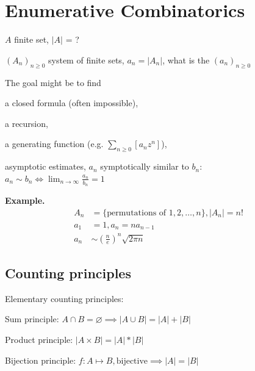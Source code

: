 

\section{Enumerative Combinatorics}

\strut{}
$A$ finite set, $|A|$ = ?

$(A_n)_{n ≥ 0}$ system of finite sets, $a_n = |A_n|$, what is the  $(a_n)_{n ≥ 0}$

The goal might be to find
\begin{compactitem}
  \item a closed formula (often impossible),
  \item a recursion,
  \item a generating function (e.g. $\sum_{n \geq 0}[a_n z^n]$),
  \item asymptotic estimates, $a_n$ symptotically similar to $b_n$:\\
    $a_n \sim b_n \iff \lim_{n \to \infty} \frac{a_n}{b_n} = 1$
\end{compactitem}


\textbf{Example.}
\begin{align*}
  A_n &= \{\text{permutations of } 1,2, \ldots, n\}, |A_n| = n! \\
  a_1 &= 1, a_n = n a_{n-1} \\
  a_n &\sim \left(\frac{n}{e} \right)^n \sqrt{2\pi n}
\end{align*}


\subsection{Counting principles}

Elementary counting principles:
\begin{compactenum}
  \item Sum principle:
    $A\cap B = \varnothing \implies |A\cup B| = |A| + |B|$
  \item Product principle:
    $|A\times B| = |A| * |B|$
  \item Bijection principle:
    $f: A\mapsto B, \text{bijective}\implies |A| = |B|$
\end{compactenum}

